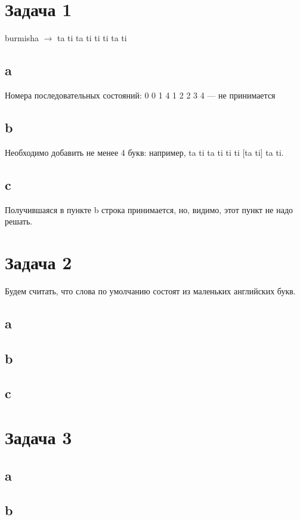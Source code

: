 \documentclass[12pt]{article}
\begin{document}
\section{Задача 1}
burmisha $\to$ ta ti ta ti ti ti ta ti \\
\subsection{a}
Номера последовательных состояний: 0 0 1 4 1 2 2 3 4 --- не принимается
\subsection{b}
Необходимо добавить не менее 4 букв: например, ta ti ta ti ti ti [ta ti] ta ti.
\subsection{c} 
Получившаяся в пункте b строка принимается, но, видимо, этот пункт не надо решать.

\section{Задача 2}
Будем считать, что слова по умолчанию состоят из маленьких английских букв.
\subsection{a}
{}
\subsection{b}
{}
\subsection{c}
{}

\section{Задача 3}
\subsection{a}
{}
\subsection{b}
{\ttfamily{(|cl|ai)(tutor|professor])(i(n|um))?}}
\end{document}

